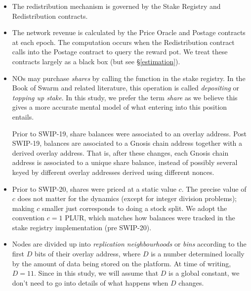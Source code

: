 \begin{itemize}
  \item The redistribution mechanism is governed by the Stake Registry and Redistribution contracts.
  \item The network revenue is calculated by the Price Oracle and Postage contracts at each epoch.
  The computation occurs when the Redistribution contract calls into the Postage contract to query the reward pot.
  We treat these contracts largely as a black box (but see \S\ref{estimation}).
  \item 
    NOs may purchase \emph{shares} by calling the  function in the stake registry.
    In the Book of Swarm and related literature, this operation is called \emph{depositing} or \emph{topping up stake}.
    In this study, we prefer the term \emph{share} as we believe this gives a more accurate mental model of what entering into this position entails.

    Prior to SWIP-19, share balances were associated to an overlay address.
    Post SWIP-19, balances are associated to a Gnosis chain address together with a derived overlay address.
    That is, after these changes, each Gnosis chain address is associated to a unique share balance, instead of possibly several keyed by different overlay addresses derived using different nonces.

  \item
    Prior to SWIP-20, shares were priced at a static value $c$.
    The precise value of $c$ does not matter for the dynamics (except for integer division problems); making $c$ smaller just corresponds to doing a stock split.
    We adopt the convention $c=1$ PLUR, which matches how balances were tracked in the stake registry implementation (pre SWIP-20).

  \item
    Nodes are divided up into \emph{replication neighbourhoods} or \emph{bins} according to the first $D$ bits of their overlay address, where $D$ is a number determined locally by the amount of data being stored on the platform.
    At time of writing, $D=11$.
    Since in this study, we will assume that $D$ is a global constant, we don't need to go into details of what happens when $D$ changes.


\end{itemize}

